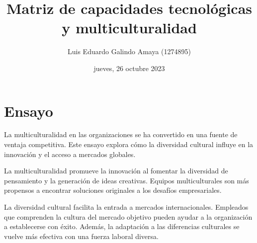 \documentclass[11pt]{article}
\author{Luis Eduardo Galindo Amaya (1274895)}
\date{jueves, 26 octubre 2023}
\title{Matriz de capacidades tecnológicas y multiculturalidad}
\begin{document}
\section*{Ensayo}
\label{sec:org43683c1}
La multiculturalidad en las organizaciones se ha convertido en una fuente de 
ventaja competitiva. Este ensayo explora cómo la diversidad cultural influye en 
la innovación y el acceso a mercados globales.


La multiculturalidad promueve la innovación al fomentar la diversidad de
pensamiento y la generación de ideas creativas. Equipos multiculturales son más
propensos a encontrar soluciones originales a los desafíos empresariales.


La diversidad cultural facilita la entrada a mercados internacionales. Empleados
que comprenden la cultura del mercado objetivo pueden ayudar a la organización
a establecerse con éxito. Además, la adaptación a las diferencias culturales 
se vuelve más efectiva con una fuerza laboral diversa.
\end{document}
